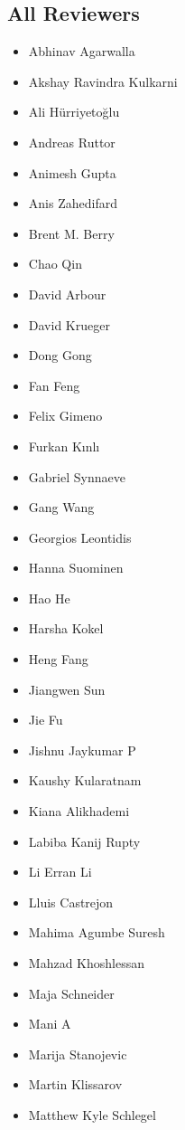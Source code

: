 \subsection{All Reviewers}

\begingroup
\fontsize{8pt}{8pt}\selectfont
\begin{multicols}{3}
\begin{itemize}[label={}]
  \item Abhinav Agarwalla
  \item Akshay Ravindra Kulkarni
  \item Ali Hürriyetoğlu
  \item Andreas Ruttor
  \item Animesh Gupta
  \item Anis Zahedifard
  \item Brent M. Berry
  \item Chao Qin
  \item David Arbour
  \item David Krueger
  \item Dong Gong
  \item Fan Feng
  \item Felix Gimeno
  \item Furkan Kınlı
  \item Gabriel Synnaeve
  \item Gang Wang
  \item Georgios Leontidis
  \item Hanna Suominen
  \item Hao He
  \item Harsha Kokel
  \item Heng Fang
  \item Jiangwen Sun
  \item Jie Fu
  \item Jishnu Jaykumar P
  \item Kaushy Kularatnam
  \item Kiana Alikhademi
  \item Labiba Kanij Rupty
  \item Li Erran Li
  \item Lluis Castrejon
  \item Mahima Agumbe Suresh
  \item Mahzad Khoshlessan
  \item Maja Schneider
  \item Mani A
  \item Marija Stanojevic
  \item Martin Klissarov
  \item Matthew Kyle Schlegel

\end{itemize}
\end{multicols}
